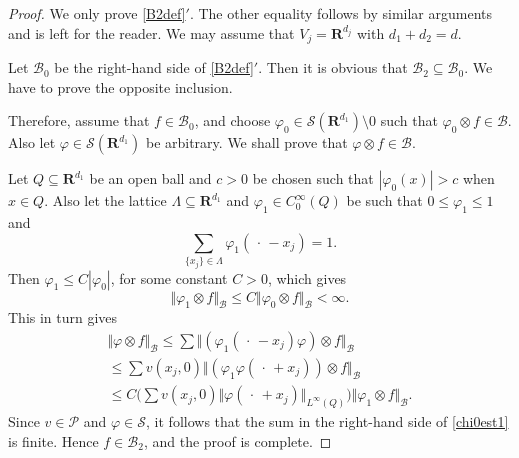 \documentclass[12pt,a4paper,reqno]{amsart}
\numberwithin{equation}{section}
\numberwithin{thm}{section}
\theoremstyle{definition}
\theoremstyle{remark}
\begin{document}
\begin{proof}
We only prove \eqref{B2def}$'$. The other equality follows by similar
arguments and is left for the reader. We may assume that $V_j={\mathbf R^{{d_j}}}$ with $d_1+d_2=d$.

\par

Let $\mathscr B_0$ be the right-hand side of \eqref{B2def}$'$. Then it
is obvious that $\mathscr B_2\subseteq \mathscr B_0$. We have to prove
the opposite inclusion.

\par

Therefore, assume that $f\in \mathscr B_0$, and choose ${\varphi}_0 \in
\mathscr S({\mathbf R^{{d_1}}}){\setminus 0}$ such that ${\varphi} _0\otimes f \in
\mathscr{B}$. Also let ${\varphi} \in \mathscr S({\mathbf R^{{d_1}}})$ be
arbitrary. We shall prove that ${\varphi} \otimes f \in
\mathscr{B}$.

\par

Let $Q \subseteq {\mathbf R^{{d_1}}}$ be an open ball and $c>0$
be chosen such that $|{\varphi} _0(x)| >c$ when $x\in Q$. Also
let the lattice $\Lambda \subseteq {\mathbf R^{{d_1}}}$ and ${\varphi} _1\in
C^{\infty}_0(Q)$ be such that $0\leq {\varphi} _1\leq 1$ and
$$
\sum_{\{x_j\}\in \Lambda} {\varphi} _1({\, \cdot \, } -x_j)=1.
$$
Then ${\varphi} _1\leq C|{\varphi} _0|$, for some constant $C>0$, which gives
$$
{\Vert {{\varphi} _1\otimes f}\Vert _{{\mathscr B}}}\le C{\Vert {{\varphi}
_0\otimes f}\Vert _{{\mathscr B}}}<\infty .
$$
This in turn gives
\begin{multline}\label{chi0est1}
{\Vert {{\varphi} \otimes f}\Vert _{{\mathscr B}}} \le \sum {\Vert {({\varphi} _1({\, \cdot \, } -x_j){\varphi}
)\otimes f}\Vert _{{\mathscr B}}}
\\[1ex]
\le \sum  v(x_j,0){\Vert {({\varphi} _1{\varphi} ({\, \cdot \, } +x_j))\otimes f}\Vert _{{\mathscr B}}} 
\\[1ex]
\le C
\Big (\sum  v(x_j,0){\Vert {{\varphi} ({\, \cdot \, } +x_j)}\Vert _{{L^\infty (Q)}}}\Big ) {\Vert {{\varphi} _1\otimes f}\Vert _{{\mathscr B}}}.
\end{multline}
Since $v\in \mathscr P$ and ${\varphi} \in \mathscr S$, it follows that the
sum in the right-hand side of \eqref{chi0est1} is finite. Hence $f\in
\mathscr B_2$, and the proof is complete.
\end{proof}

\par
\end{document}
